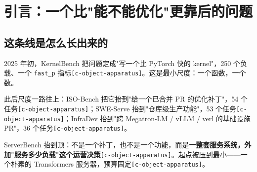 \begin{abstract}
\textbf{第四，增益数字必须先过测量关。} 已有工作把"提议—测量—保留"循环背后的四种失效模式列清楚，代价是具体的：诚实基线把最好的 kernel 从 10.6 打到 2.03{\scriptsize\texttt{[c-\hspace{0pt}measurement]}}。


本文因此给出一条比"agent 能优化系统"更窄的结论：\textbf{这条线的真正瓶颈不是 agent 的搜索能力，而是评测装置的构造难度}{\scriptsize\texttt{[c-\hspace{0pt}test-\hspace{0pt}prompt]}}。


\textbf{关键词}：coding agent；LLM 服务系统；基准设计；目标函数；验证；reward hacking


\end{abstract}
\section{引言：一个比"能不能优化"更靠后的问题}

\subsection{这条线是怎么长出来的}

2025 年初，KernelBench 把问题定成"写一个比 PyTorch 快的 kernel"，250 个负载、一个 \texttt{fast\_p} 指标{\scriptsize\texttt{[c-\hspace{0pt}object-\hspace{0pt}apparatus]}}。这是最小尺度：一个函数，一个数。


此后尺度一路往上：ISO-Bench 把它抬到"给一个已合并 PR 的优化补丁"，54 个任务{\scriptsize\texttt{[c-\hspace{0pt}object-\hspace{0pt}apparatus]}}；SWE-Serve 抬到"仓库级生产功能"，53 个任务{\scriptsize\texttt{[c-\hspace{0pt}object-\hspace{0pt}apparatus]}}；InfraDev 抬到"跨 Megatron-LM / vLLM / verl 的基础设施 PR"，36 个任务{\scriptsize\texttt{[c-\hspace{0pt}object-\hspace{0pt}apparatus]}}。


ServerBench 抬到顶：不是一个补丁，也不是一个功能，而是\textbf{一整套服务系统，外加"服务多少负载"这个运营决策}{\scriptsize\texttt{[c-\hspace{0pt}object-\hspace{0pt}apparatus]}}。起点被压到最小——一个朴素的 Transformers 服务器，预算固定{\scriptsize\texttt{[c-\hspace{0pt}object-\hspace{0pt}apparatus]}}。


